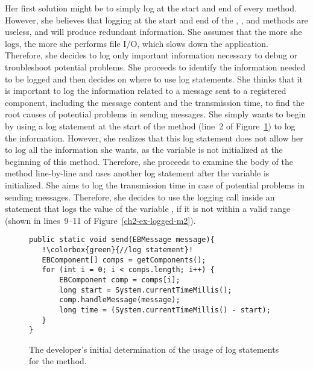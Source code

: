 Her first solution might be to simply log at the start and end of every method. However, she believes that logging at the start and end of the , \-\-, and  methods are useless, and will produce redundant information. She assumes that the more she logs, the more she performs file I/O, which slows down the application. Therefore, she decides to log only important information necessary to debug or troubleshoot potential problems. She proceeds to identify the information needed to be logged and then decides on where to use log statements. She thinks that it is important to log the information related to a message sent to a registered component, including the message content and the transmission time, to find the root causes of potential problems in sending messages. She simply wants to begin by using a log statement at the start of the  method (line~2 of Figure~\ref{ch2-ex-logged-m1}) to log the information. However, she realizes that this log statement does not allow her to log all the information she wants, as the  variable is not initialized at the beginning of this method. Therefore, she proceeds to examine the body of the  method line-by-line and uses another log statement after the  variable is initialized. She aims to log the transmission time in case of potential problems in sending messages. Therefore, she decides to use the logging call inside an  statement that logs the value of the variable , if it is not within a valid range (shown in lines~9--11 of Figure~\ref{ch2-ex-logged-m2}).

\begin{figure}[p]
\def\baselinestretch{1}
\begin{lstlisting}[escapechar=!]
public static void send(EBMessage message){
   !\colorbox{green}{//log statement}!
   EBComponent[] comps = getComponents();
   for (int i = 0; i < comps.length; i++) {
       EBComponent comp = comps[i];
       long start = System.currentTimeMillis();
       comp.handleMessage(message);
       long time = (System.currentTimeMillis() - start);
   }
}
\end{lstlisting}
\caption[The developer's initial determination of the usage of logging calls.]{The developer's initial determination of the usage of log statements for the  method.\label{ch2-ex-logged-m1}}
\end{figure}

